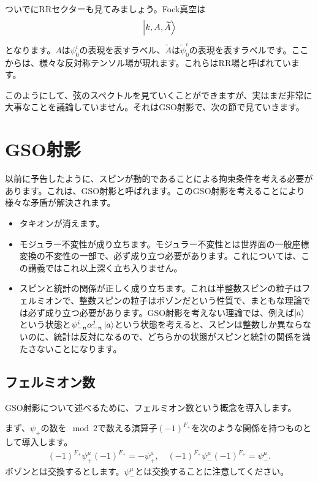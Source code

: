 \documentclass[report,paper=a4, fontsize=12pt, line_length=16cm, number_of_lines=34,dvipdfmx]{jlreq}
\numberwithin{equation}{chapter}
\numberwithin{equation}{section}
\newcommand{\At}{\widetilde{A}}
\newcommand{\psit}{\tilde{\psi}}
\begin{document}
ついでにRRセクターも見てみましょう。Fock真空は
\begin{align}
  \ket{k,A,\At}
\end{align}
となります。$A$は$\psi^{i}_{0}$の表現を表すラベル、$\At$は$\psit^{i}_{0}$の表現を表すラベルです。ここからは、様々な反対称テンソル場が現れます。これらはRR場と呼ばれています。

このようにして、弦のスペクトルを見ていくことができますが、実はまだ非常に大事なことを議論していません。それはGSO射影で、次の節で見ていきます。

\section{GSO射影}

以前に予告したように、スピンが動的であることによる拘束条件を考える必要があります。これは、GSO射影と呼ばれます。このGSO射影を考えることにより様々な矛盾が解決されます。
\begin{itemize}
  \item タキオンが消えます。
  \item モジュラー不変性が成り立ちます。モジュラー不変性とは世界面の一般座標変換の不変性の一部で、必ず成り立つ必要があります。これについては、この講義ではこれ以上深く立ち入りません。
  \item スピンと統計の関係が正しく成り立ちます。これは半整数スピンの粒子はフェルミオンで、整数スピンの粒子はボゾンだという性質で、まともな理論では必ず成り立つ必要があります。GSO射影を考えない理論では、例えば$\ket{a}$という状態と$\psi_{-n}^{i}\alpha_{-n}^{j}\ket{a}$という状態を考えると、スピンは整数しか異ならないのに、統計は反対になるので、どちらかの状態がスピンと統計の関係を満たさないことになります。
\end{itemize}

\subsection{フェルミオン数}
GSO射影について述べるために、フェルミオン数という概念を導入します。

まず、$\psi_{+}$の数を$\mod 2$で数える演算子$(-1)^{F_+}$を次のような関係を持つものとして導入します。
\begin{align}
  (-1)^{F_+}\psi_{+}^{\mu}(-1)^{F_+}=-\psi_{+}^{\mu},\quad
  (-1)^{F_+}\psi_{-}^{\mu}(-1)^{F_+}=\psi_{-}^{\mu}.
\end{align}
ボゾンとは交換するとします。$\psi^{\mu}_{-}$とは交換することに注意してください。
\end{document}
